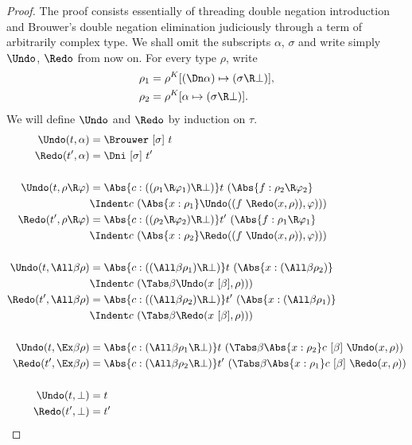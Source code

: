 \documentclass{amsart}
\let\phi=\varphi %
\begin{document}
\begin{proof}
The proof consists essentially of threading double negation
introduction and Brouwer's double negation elimination
judiciously through a term of arbitrarily complex type. We shall
omit the subscripts $\alpha$, $\sigma$ and write simply $\Undo$,
$\Redo$ from now on. For every type $\rho$, write
\begin{align*}
\rho_1 & = \rho^K[(\Dn\alpha)\mapsto(\sigma\R\bot)],\\
\rho_2 & = \rho^K[\alpha\mapsto(\sigma\R\bot)].
\end{align*}
We will define $\Undo$ and $\Redo$ by induction on $\tau$.
\begin{align*}
\Undo(t,\alpha) & = \Brouwer~[\sigma]~t\\
\Redo(t',\alpha) & = \Dni~[\sigma]~t'\\
\\
\Undo(t,\rho\R\phi) & =
  \Abs{c : ((\rho_1 \R \phi_1) \R \bot)}
  t~(\Abs{f : \rho_2 \R \phi_2}\\
  &\Indent c~(\Abs{x : \rho_1}
  \Undo((f~\Redo(x, \rho)), \phi) ))\\
\Redo(t',\rho\R\phi) & =
  \Abs{c : ((\rho_2 \R \phi_2) \R \bot)}
  t'~(\Abs{f : \rho_1 \R \phi_1}\\
  &\Indent c~(\Abs{x : \rho_2}
  \Redo((f~\Undo(x, \rho)), \phi) ))\\
\\
\Undo(t, \All\beta \rho) & =
  \Abs{c : ((\All\beta \rho_1) \R \bot)}
  t~(\Abs{x : (\All\beta \rho_2)} \\
  &\Indent c~(\Tabs\beta \Undo(x~[\beta], \rho)) )\\
\Redo(t', \All\beta \rho) & =
  \Abs{c : ((\All\beta \rho_2) \R \bot)}
  t'~(\Abs{x : (\All\beta \rho_1)} \\
  &\Indent c~(\Tabs\beta \Redo(x~[\beta], \rho)) )\\
\\
\Undo(t, \Ex\beta \rho) & =
  \Abs{c : (\All\beta \rho_1 \R \bot)}
  t~(\Tabs\beta \Abs{x : \rho_2}
  c~[\beta]~\Undo(x,\rho) )\\
\Redo(t', \Ex\beta \rho) & =
  \Abs{c : (\All\beta \rho_2 \R \bot)}
  t'~(\Tabs\beta \Abs{x : \rho_1}
  c~[\beta]~\Redo(x,\rho) )\\
\\
\Undo(t,\bot) & = t \\
\Redo(t',\bot) & = t' \qedhere
\end{align*}
\end{proof}
\end{document}
